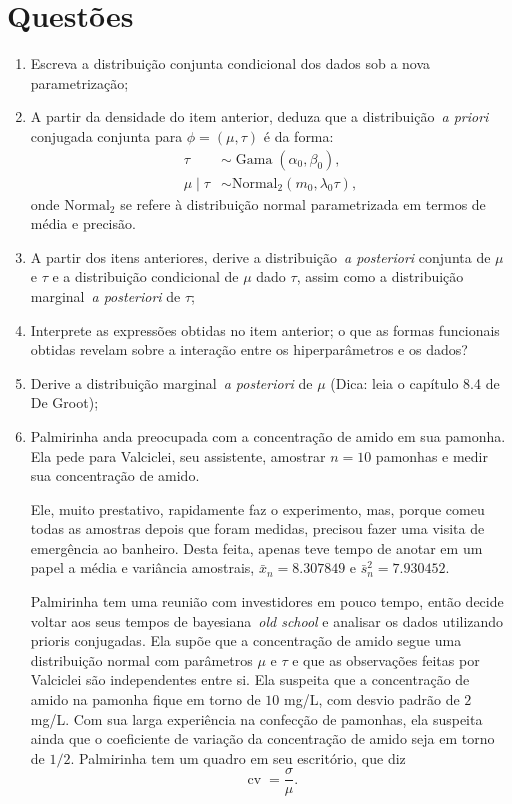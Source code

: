 \documentclass[a4paper,10pt, notitlepage]{report}
\begin{document}
\section*{Questões}
\begin{enumerate}
 \item Escreva a distribuição conjunta condicional dos dados sob a nova parametrização;
 \item A partir da densidade do item anterior, deduza que a distribuição~\textit{a priori} conjugada conjunta para $\phi = (\mu, \tau)$ é da forma:
\begin{equation} \label{eq:prior}  
 \begin{aligned} 
  \tau &\sim \operatorname{Gama}(\alpha_0, \beta_0),\\
  \mu \mid \tau &\sim \operatorname{Normal_2}(m_0, \lambda_0\tau),
 \end{aligned}
\end{equation} 
onde $\operatorname{Normal_2}$ se refere à distribuição normal parametrizada em termos de média e precisão.
\item A partir dos itens anteriores, derive a distribuição~\textit{a posteriori} conjunta de $\mu$ e $\tau$ e a distribuição condicional de $\mu$ dado $\tau$, assim como a distribuição marginal~\textit{a posteriori} de $\tau$;
\item Interprete as expressões obtidas no item anterior; o que as formas funcionais obtidas revelam sobre a interação entre os hiperparâmetros e os dados?
\item Derive a distribuição marginal~\textit{a posteriori} de $\mu$ (Dica: leia o capítulo 8.4 de De Groot);
\item Palmirinha anda preocupada com a concentração de amido em sua pamonha.
Ela pede para Valciclei, seu assistente, amostrar $n=10$ pamonhas e medir sua concentração de amido.

Ele, muito prestativo, rapidamente faz o experimento, mas, porque comeu todas as amostras depois que foram medidas, precisou fazer uma visita de emergência ao banheiro. 
Desta feita, apenas teve tempo de anotar em um papel a média e variância amostrais, $\bar{x}_n =  8.307849$ e $\bar{s}^2_n = 7.930452$.

Palmirinha tem uma reunião com investidores em pouco tempo, então decide voltar aos seus tempos de bayesiana~\textit{old school} e analisar os dados utilizando prioris conjugadas.
Ela supõe que a concentração de amido segue uma distribuição normal com parâmetros $\mu$ e $\tau$ e que as observações feitas por Valciclei são independentes entre si.
Ela suspeita que a concentração de amido na pamonha fique em torno de $10$ mg/L, com desvio padrão de  $2$ mg/L.
Com sua larga experiência na confecção de pamonhas, ela suspeita ainda que o coeficiente de variação da concentração de amido seja em torno de $1/2$.
Palmirinha tem um quadro em seu escritório, que diz
\[ \operatorname{cv} = \frac{\sigma}{\mu}. \]


\end{enumerate}
\end{document}
